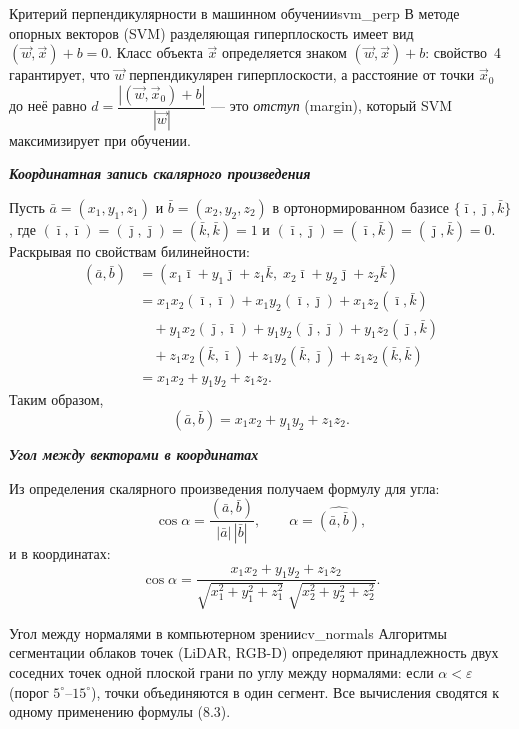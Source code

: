 \documentclass[12pt,a4paper]{article}
\newcommand{\va}{\bar{a}}
\newcommand{\vb}{\bar{b}}
\newcommand{\vi}{\bar{\imath}}
\newcommand{\vj}{\bar{\jmath}}
\newcommand{\vk}{\bar{k}}
\begin{document}
\begin{remarkIT}{Критерий перпендикулярности в машинном обучении}{svm_perp}
  В методе опорных векторов (SVM) разделяющая гиперплоскость имеет
  вид $(\vec{w},\vec{x})+b=0$. Класс объекта $\vec{x}$ определяется
  знаком $(\vec{w},\vec{x})+b$: свойство~4 гарантирует, что $\vec{w}$
  перпендикулярен гиперплоскости, а расстояние от точки $\vec{x}_0$
  до неё равно
  $d = \dfrac{|(\vec{w},\vec{x}_0)+b|}{|\vec{w}|}$
  --- это \textit{отступ} (margin), который SVM максимизирует
  при обучении.
\end{remarkIT}

\medskip

\textbf{\textit{Координатная запись скалярного произведения}}

Пусть $\va = (x_1, y_1, z_1)$ и $\vb = (x_2, y_2, z_2)$ в
ортонормированном базисе $\{\vi,\vj,\vk\}$, где
$(\vi,\vi)=(\vj,\vj)=(\vk,\vk)=1$ и
$(\vi,\vj)=(\vi,\vk)=(\vj,\vk)=0$.
Раскрывая по свойствам билинейности:
\begin{align*}
  (\va, \vb)
  &= (x_1\vi + y_1\vj + z_1\vk,\; x_2\vi + y_2\vj + z_2\vk) \\[6pt]
  &= x_1 x_2(\vi,\vi) + x_1 y_2(\vi,\vj) + x_1 z_2(\vi,\vk) \\[4pt]
  &\quad + y_1 x_2(\vj,\vi) + y_1 y_2(\vj,\vj) + y_1 z_2(\vj,\vk) \\[4pt]
  &\quad + z_1 x_2(\vk,\vi) + z_1 y_2(\vk,\vj) + z_1 z_2(\vk,\vk) \\[6pt]
  &= x_1 x_2 + y_1 y_2 + z_1 z_2.
\end{align*}
Таким образом,
\begin{equation}
  \boxed{(\va, \vb) = x_1 x_2 + y_1 y_2 + z_1 z_2.} \tag{8.2}
\end{equation}

\textbf{\textit{Угол между векторами в координатах}}

Из определения скалярного произведения получаем формулу для угла:
\[
  \cos\alpha = \frac{(\va,\vb)}{|\va|\,|\vb|},
  \qquad \alpha = \widehat{(\va,\vb)},
\]
и в координатах:
\begin{equation}
  \cos\alpha =
  \frac{x_1 x_2 + y_1 y_2 + z_1 z_2}
  {\sqrt{x_1^2+y_1^2+z_1^2}\;\sqrt{x_2^2+y_2^2+z_2^2}}. \tag{8.3}
\end{equation}

\begin{remarkIT}{Угол между нормалями в компьютерном зрении}{cv_normals}
  Алгоритмы сегментации облаков точек (LiDAR, RGB-D) определяют
  принадлежность двух соседних точек одной плоской грани по углу между
  нормалями: если $\alpha < \varepsilon$ (порог $5^\circ$--$15^\circ$),
  точки объединяются в один сегмент. Все вычисления сводятся к одному
  применению формулы (8.3).
\end{remarkIT}
\end{document}
